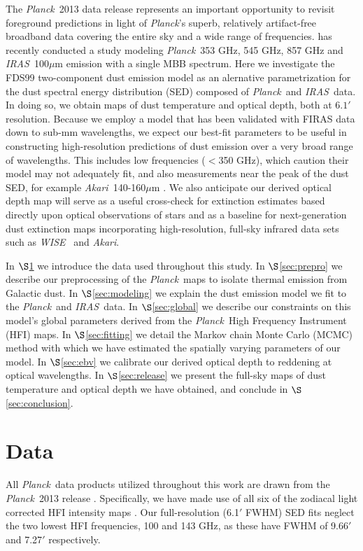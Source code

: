 \documentclass{emulateapj}
\newcommand{\IRAS}{{\it IRAS}}
\newcommand{\PLANCK}{{\it Planck}}
\newcommand{\AKARI}{{\it Akari}}
\newcommand{\WISE}{{\it WISE}}
\begin{document}
The \PLANCK~2013 data release \citep{planck2013} represents an important 
opportunity to revisit foreground predictions in light of \PLANCK's superb, 
relatively artifact-free broadband data covering the entire sky and a wide 
range of frequencies. \cite{planckdust} has recently conducted a study modeling
\PLANCK~353 GHz, 545 GHz, 857 GHz and \IRAS~100$\mu$m emission with a single
MBB spectrum. Here we investigate the FDS99 two-component dust emission model 
as an alernative parametrization for the dust spectral energy distribution 
(SED) composed  of \PLANCK~and \IRAS~data. In doing so, we obtain maps of dust 
temperature and optical depth, both at $6.1'$ resolution. Because we employ a 
model that has been validated with FIRAS data down to sub-mm wavelengths, we 
expect our best-fit parameters to be useful in constructing high-resolution 
predictions of dust emission over a very broad range of wavelengths. This 
includes low frequencies ($<$350 GHz), which \cite{planckdust} caution their 
model may not adequately fit, and also measurements near the peak of the dust 
SED, for example \AKARI~140-160$\mu$m \citep{akari}. We also anticipate our 
derived optical depth map will serve as a useful cross-check for extinction 
estimates based directly upon optical observations of stars
\citep[e.g.][]{schlafly14} and as a baseline for next-generation dust 
extinction maps incorporating high-resolution, full-sky infrared data sets such
as \WISE~\citep{wright10, meisner14} and \AKARI.


In $\S$\ref{sec:data} we introduce the data used throughout this study. In 
$\S$\ref{sec:prepro} we describe our preprocessing of the \PLANCK~maps to 
isolate thermal emission from Galactic dust. In $\S$\ref{sec:modeling} we 
explain the dust emission model we fit to the \PLANCK~and \IRAS~data. In 
$\S$\ref{sec:global} we describe our constraints on this model's global 
parameters derived from the \PLANCK~High Frequency Instrument (HFI) maps. In 
$\S$\ref{sec:fitting} we detail the Markov chain Monte Carlo (MCMC) method with
which we have estimated the spatially varying parameters of our model. In 
$\S$\ref{sec:ebv} we calibrate our derived optical depth to reddening at 
optical wavelengths. In $\S$\ref{sec:release} we present the full-sky maps of 
dust temperature and optical depth we have obtained, and conclude in 
$\S$\ref{sec:conclusion}.

\section{Data}
\label{sec:data}
All \PLANCK~data products utilized throughout this work are drawn from the 
\PLANCK~2013 release \citep{planck2013}. Specifically, we have made use 
of all six of the zodiacal light corrected HFI intensity maps
\citep[\texttt{R1.10\_nominal\_ZodiCorrected},][]{planckzodi}. Our 
full-resolution (6.1$'$ FWHM) SED fits neglect the two lowest HFI frequencies, 
100 and 143 GHz, as these have FWHM of 9.66$'$ and 7.27$'$ respectively.
\end{document}
